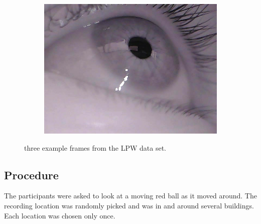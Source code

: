 \begin{figure}[ht]
\begin{subfigure}{.30\textwidth}
      \label{fig:ds2}
    \end{subfigure}%
    \begin{subfigure}{.30\textwidth}
      \centering
      \includegraphics[width=.9\linewidth]{plots/eye_dataset/eye3.png}

      \label{fig:ds3}
    \end{subfigure}
    \caption{three example frames from the LPW data set.}
    \label{fig:example_frame}
    \end{figure}

    \subsection{Procedure}
    The participants were asked to look at a moving red ball as it moved around. The recording location was randomly picked and was in and around several buildings. Each location was chosen only once. 

    